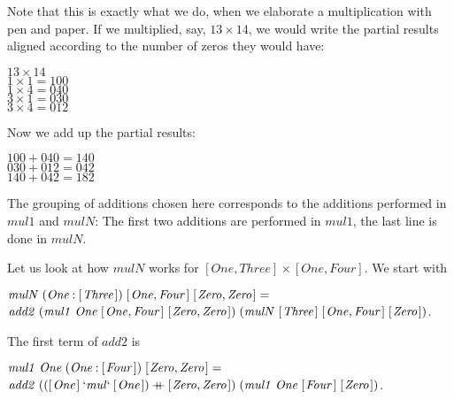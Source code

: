 \documentclass{scrreprt}
\newcommand{\Conid}[1]{\mathit{#1}}
\newcommand{\Varid}[1]{\mathit{#1}}
\newcommand{\plus}{\mathbin{+\!\!\!+}}
\begin{document}
Note that this is exactly what we do,
when we elaborate a multiplication with pen and paper.
If we multiplied, say, $13 \times 14$,
we would write the partial results aligned
according to the number of zeros they would have:

\begin{minipage}{\textwidth}
$13 \times 14$\\
$1 \times 1 = 100$\\
$1 \times 4 = 040$\\
$3 \times 1 = 030$\\
$3 \times 4 = 012$
\end{minipage}

Now we add up the partial results:

\begin{minipage}{\textwidth}
$100 + 040 = 140$\\ 
$030 + 012 = 042$\\
$140 + 042 = 182$
\end{minipage}

The grouping of additions chosen here corresponds
to the additions performed in \ensuremath{\Varid{mul1}} and \ensuremath{\Varid{mulN}}:
The first two additions are performed in \ensuremath{\Varid{mul1}},
the last line is done in \ensuremath{\Varid{mulN}}.

Let us look at how \ensuremath{\Varid{mulN}} works for
$[One,Three] \times [One,Four]$.
We start with 

\begin{minipage}{\textwidth}
\ensuremath{\Varid{mulN}\;(\Conid{One}\mathbin{:}[\mskip1.5mu \Conid{Three}\mskip1.5mu])\;[\mskip1.5mu \Conid{One},\Conid{Four}\mskip1.5mu]\;[\mskip1.5mu \Conid{Zero},\Conid{Zero}\mskip1.5mu]\mathrel{=}}\\
\ensuremath{\Varid{add2}\;(\Varid{mul1}\;\Conid{One}\;[\mskip1.5mu \Conid{One},\Conid{Four}\mskip1.5mu]\;[\mskip1.5mu \Conid{Zero},\Conid{Zero}\mskip1.5mu])\;(\Varid{mulN}\;[\mskip1.5mu \Conid{Three}\mskip1.5mu]\;[\mskip1.5mu \Conid{One},\Conid{Four}\mskip1.5mu]\;[\mskip1.5mu \Conid{Zero}\mskip1.5mu])}.
\end{minipage}

The first term of \ensuremath{\Varid{add2}} is

\begin{minipage}{\textwidth}
\ensuremath{\Varid{mul1}\;\Conid{One}\;(\Conid{One}\mathbin{:}[\mskip1.5mu \Conid{Four}\mskip1.5mu])\;[\mskip1.5mu \Conid{Zero},\Conid{Zero}\mskip1.5mu]\mathrel{=}}\\
\ensuremath{\Varid{add2}\;(([\mskip1.5mu \Conid{One}\mskip1.5mu]\mathbin{`\Varid{mul}`}[\mskip1.5mu \Conid{One}\mskip1.5mu])\plus [\mskip1.5mu \Conid{Zero},\Conid{Zero}\mskip1.5mu])\;(\Varid{mul1}\;\Conid{One}\;[\mskip1.5mu \Conid{Four}\mskip1.5mu]\;[\mskip1.5mu \Conid{Zero}\mskip1.5mu])}.
\end{minipage}
\end{document}
